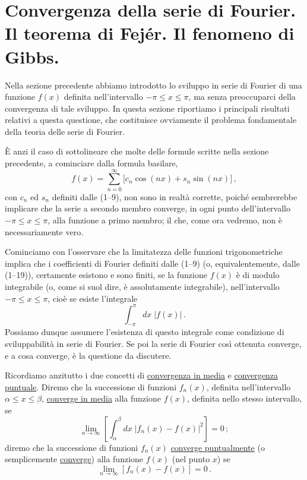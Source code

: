 \documentclass[11pt, a4paper]{book}
\numberwithin{equation}{section}
\begin{document}
\section{Convergenza della serie di Fourier. Il teorema di Fejér. Il fenomeno di Gibbs.}

Nella sezione precedente abbiamo introdotto lo sviluppo in serie di Fourier di una funzione $f(x)$ definita nell'intervallo $-\pi \leq x \leq \pi$, ma senza preoccuparci della convergenza di tale sviluppo. In questa sezione riportiamo i principali risultati relativi a questa questione, che costituisce ovviamente il problema fondamentale della teoria delle serie di Fourier.

È anzi il caso di sottolineare che molte delle formule scritte nella sezione precedente, a cominciare dalla formula basilare,
\begin{equation}
  f(x) = \sum_{n=0}^{\infty}\bigl[c_n\cos(nx) + s_n\sin(nx)\bigr]\,, \tag{1}
\end{equation}
con $c_n$ ed $s_n$ definiti dalle (1--9), non sono in realtà corrette, poiché sembrerebbe implicare che la serie a secondo membro converge, in ogni punto dell'intervallo $-\pi \leq x \leq \pi$, alla funzione a primo membro; il che, come ora vedremo, non è necessariamente vero.

Cominciamo con l'osservare che la limitatezza delle funzioni trigonometriche implica che i coefficienti di Fourier definiti dalle (1--9) (o, equivalentemente, dalle (1--19)), certamente esistono e sono finiti, se la funzione $f(x)$ è di modulo integrabile (o, come si suol dire, è assolutamente integrabile), nell'intervallo $-\pi \leq x \leq \pi$, cioè se esiste l'integrale
\[
  \int_{-\pi}^{\pi} dx\;|f(x)|\,.
\]
Possiamo dunque assumere l'esistenza di questo integrale come condizione di sviluppabilità in serie di Fourier. Se poi la serie di Fourier così ottenuta converge, e a cosa converge, è la questione da discutere.

Ricordiamo anzitutto i due concetti di \uline{convergenza in media} e \uline{convergenza puntuale}. Diremo che la successione di funzioni $f_n(x)$, definita nell'intervallo $\alpha \leq x \leq \beta$, \uline{converge in media} alla funzione $f(x)$, definita nello stesso intervallo, se
\begin{equation}
  \lim_{n\to\infty}\left[\int_\alpha^\beta dx\;|f_n(x)-f(x)|^2\right] = 0\,; \tag{2}
\end{equation}
diremo che la successione di funzioni $f_n(x)$ \uline{converge puntualmente} (o semplicemente \uline{converge}) alla funzione $f(x)$ (nel punto $x$) se
\begin{equation}
  \lim_{n\to\infty}\left[f_n(x)-f(x)\right] = 0\,. \tag{3}
\end{equation}
\end{document}
